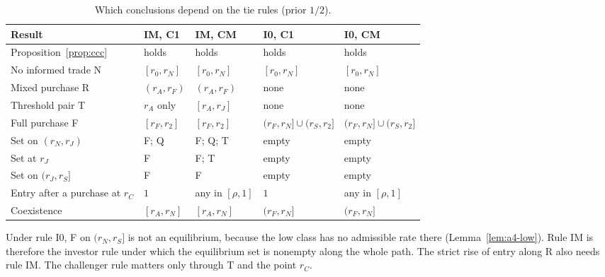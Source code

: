 \begin{table}[ht]
\centering
\caption{Which conclusions depend on the tie rules (prior \(1/2\)).}\label{tab:a4-ties}
\small
\begin{tabular}{@{}lllll@{}}
\toprule
Result & IM, C1 & IM, CM & I0, C1 & I0, CM\\
\midrule
Proposition~\ref{prop:ccc} & holds & holds & holds & holds\\
No informed trade N & \([r_0,r_N]\) & \([r_0,r_N]\) & \([r_0,r_N]\) & \([r_0,r_N]\)\\
Mixed purchase R & \((r_A,r_F)\) & \((r_A,r_F)\) & none & none\\
Threshold pair T & \(r_A\) only & \([r_A,r_J]\) & none & none\\
Full purchase F & \([r_F,r_2]\) & \([r_F,r_2]\) & \((r_F,r_N]\cup(r_S,r_2]\) & \((r_F,r_N]\cup(r_S,r_2]\)\\
Set on \((r_N,r_J)\) & F; Q & F; Q; T & empty & empty\\
Set at \(r_J\) & F & F; T & empty & empty\\
Set on \((r_J,r_S]\) & F & F & empty & empty\\
Entry after a purchase at \(r_C\) & \(1\) & any in \([\rho,1]\) & \(1\) & any in \([\rho,1]\)\\
Coexistence & \([r_A,r_N]\) & \([r_A,r_N]\) & \((r_F,r_N]\) & \((r_F,r_N]\)\\
\bottomrule
\end{tabular}
\end{table}

Under rule I0, F on \((r_N,r_S]\) is not an equilibrium, because the low class has no admissible rate there
(Lemma~\ref{lem:a4-low}). Rule IM is therefore the investor rule under which the equilibrium set is nonempty along
the whole path. The strict rise of entry along R also needs rule IM. The challenger rule matters only through T
and the point \(r_C\).

